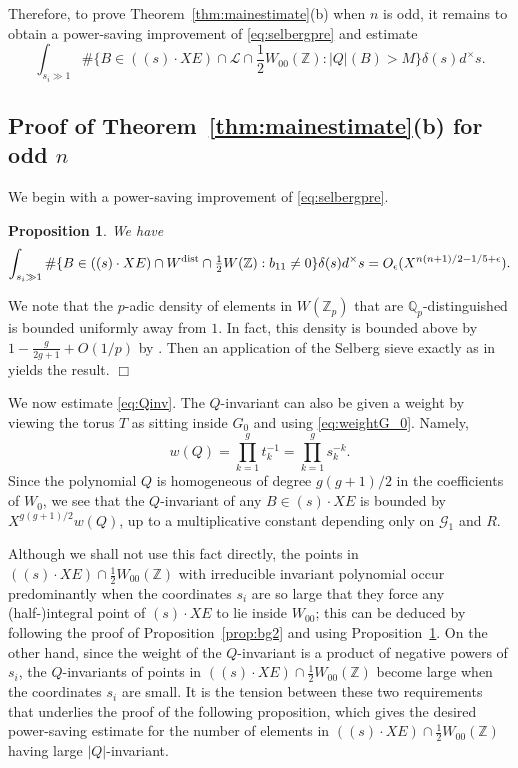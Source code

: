 \documentclass[11pt]{article}
\def\Z{{\mathbb Z}}
\def\dist{{\rm dist}}
\def\Q{{\mathbb Q}}
\def\Z{{\mathbb Z}}
\def\Q{{\mathbb Q}}
\def\GG{{\mathcal G}}
\def\LL{{\mathcal L}}
\newtheorem{proposition}[theorem]{Proposition}
\newenvironment{proof}{\noindent {\bf Proof:}}{$\Box$ \vspace{2 ex}}
\begin{document}
Therefore, to prove Theorem~\ref{thm:mainestimate}(b) when $n$ is odd, it remains to obtain a power-saving improvement of \eqref{eq:selbergpre} and estimate
\begin{equation}\label{eq:Qinv}
\int_{s_i\gg 1} \#\{B\in ((s)\cdot XE)\cap \LL\cap
{\textstyle\frac12} W_{00}(\Z):|Q|(B)>M\}\delta(s)d^\times s.
\end{equation}


\subsection{Proof of Theorem~\ref{thm:mainestimate}(b)
  for odd $n$}\label{sgomodd}

We begin with a power-saving improvement of \eqref{eq:selbergpre}.

\begin{proposition}\label{propodd}
  We have
  \begin{equation*}
\displaystyle\int_{s_i\gg 1} \#\{B\in ((s)\cdot XE)\cap W^\dist \cap {\textstyle\frac12} W(\Z): b_{11}\neq 0\}\delta(s)d^\times s =O_\epsilon(X^{n(n+1)/2-1/5+\epsilon}).
  \end{equation*}
\end{proposition}
\begin{proof}
We note that the $p$-adic density of elements in $W(\Z_p)$ that are
$\Q_p$-distinguished is bounded uniformly away from $1$. In fact, this
density is bounded above by $1 - \frac{g}{2g+1}+O(1/p)$ by 
\cite[\S10.7]{BG2}.  Then an application of the Selberg sieve exactly
as in \cite{ShTs} yields the result.
\end{proof}

We now estimate \eqref{eq:Qinv}. The $Q$-invariant can also be
given a weight by viewing the torus $T$ as sitting inside $G_0$ and
using \eqref{eq:weightG_0}. Namely,
\begin{equation}\label{eqQweight}
w(Q)=\prod_{k=1}^gt_k^{-1}=\prod_{k=1}^gs_k^{-k}.
\end{equation}
Since the polynomial $Q$ is homogeneous of degree $g(g+1)/2$ in the
coefficients of $W_0$, we see that the $Q$-invariant of any $B\in
(s)\cdot XE$ is bounded by $X^{g(g+1)/2}w(Q)$, up to a multiplicative
constant depending only on $\GG_1$ and $R$.

Although we shall not use this fact directly, 
the points in $((s)\cdot XE)\cap \frac12W_{00}(\Z)$ with irreducible
invariant polynomial occur predominantly when the coordinates $s_i$
are so large that they force any (half-)integral point of $(s)\cdot
XE$ to lie inside $W_{00}$; this can be deduced by following the  
proof of Proposition~\ref{prop:bg2} and using Proposition~\ref{propodd}. 
On the other hand, since the weight of
the $Q$-invariant is a product of negative powers of $s_i$, the
$Q$-invariants of points in $((s)\cdot XE)\cap \frac12W_{00}(\Z)$
become large when the coordinates $s_i$ are small.  It is the tension
between these two requirements that underlies the proof of the following proposition, 
which gives the desired power-saving estimate for the
number of elements in $((s)\cdot XE) \cap \frac12W_{00}(\Z)$ having
large $|Q|$-invariant.
\end{document}
